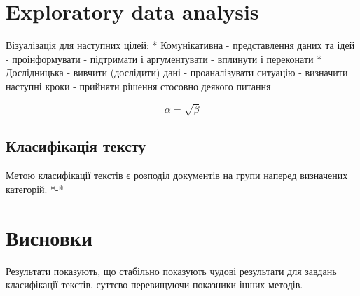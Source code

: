 \section{Exploratory data analysis}
Візуалізація для наступних цілей:
* Комунікативна
- представлення даних та ідей
- проінформувати
- підтримати і аргументувати
- вплинути і переконати
* Дослідницька
- вивчити (дослідити) дані
- проаналізувати ситуацію
- визначити наступні кроки
- прийняти рішення стосовно деякого питання

\begin{equation}
    \label{simple_equation}
    \alpha = \sqrt{ \beta }
\end{equation}

\subsection{Класифікація тексту}
Метою класифікації текстів є розподіл документів на групи наперед визначених категорій. *-*


\section{Висновки}
Результати показують, що стабільно показують чудові результати для завдань класифікації
текстів, суттєво перевищуючи показники інших методів.

